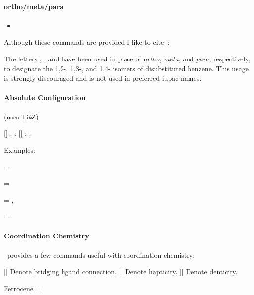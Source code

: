 \documentclass[load-preamble+]{cnltx-doc}
\newcommand*\TikZ{Ti\textit{k}Z}
\begin{document}
\paragraph{ortho/meta/para}
\begin{itemize}
  \item[]
     \iupac{\ortho} \quad
      \iupac{\meta} \quad
      \iupac{\para}
\end{itemize}

Although these commands are provided I like to cite~\cite{iupac:bluebook}:

\begin{cnltxquote}
  The letters \iupac{\ortho}, \iupac{\meta}, and \iupac{\para} have been used
  in place of \textit{ortho}, \textit{meta}, and \textit{para}, respectively,
  to designate the 1,2-, 1,3-, and 1,4- isomers of disubstituted benzene.
  This usage is strongly discouraged and is not used in preferred \acs{iupac}
  names.
\end{cnltxquote}

\paragraph{Absolute Configuration} (uses \TikZ)
\begin{commands}
  []
    : \Rconf \quad {}\oarg{}: \Rconf[]
  []
    : \Sconf \quad {}\oarg{}: \Sconf[]
\end{commands}

Examples:\nopagebreak
\begin{example}
   =
   \par
   =
   \par
   =
  , \par
   \par
   =
\end{example}

\paragraph{Coordination Chemistry}

\chemmacros\ provides a few commands useful with coordination chemistry:
\begin{commands}
  [\quad{}]
    Denote bridging ligand connection.
  [\quad{}]
    Denote hapticity.
  [\quad{}]
    Denote denticity.
\end{commands}
\begin{example}
  Ferrocene =  \par
\end{example}
\end{document}
